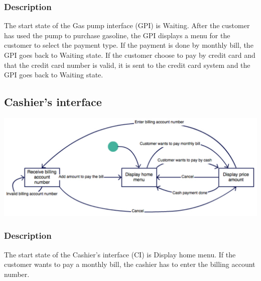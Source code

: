 \documentclass[11pt, a4paper]{article}
\newcommand{\state}[1]{\textsf{#1}}
\begin{document}
\subsubsection*{Description}

The start state of the Gas pump interface (GPI) is \state{Waiting}.
After the customer has used the pump to purchase gasoline, the GPI displays a menu for the customer to select the payment type.
If the payment is done by monthly bill, the GPI goes back to \state{Waiting} state.
If the customer choose to pay by credit card and that the credit card number is valid, it is sent to the credit card system and the GPI goes back to \state{Waiting} state.


\medskip

\subsection{Cashier's interface}

\begin{center}
\includegraphics[width=\textwidth]{CashierInterface_diagram.pdf}
\end{center}

\subsubsection*{Description}

The start state of the Cashier's interface (CI) is \state{Display home menu}.
If the customer wants to pay a monthly bill, the cashier has to enter the billing account number.
\end{document}
